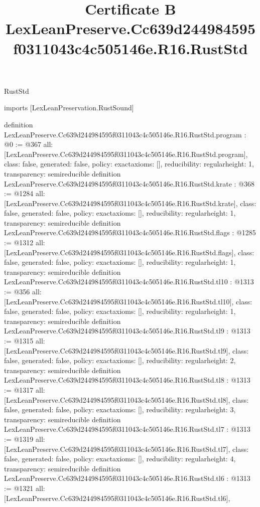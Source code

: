 \begin{lexlean}{RustStd}
\title{Certificate B LexLeanPreserve.Cc639d244984595f0311043c4c505146e.R16.RustStd}
\begin{coremodule}
imports [LexLeanPreservation.RustSound]

definition LexLeanPreserve.Cc639d244984595f0311043c4c505146e.R16.RustStd.program : @0 := @367 {
  all: [LexLeanPreserve.Cc639d244984595f0311043c4c505146e.R16.RustStd.program],
  class: false,
  generated: false,
  policy: exact{axioms: []},
  reducibility: regular{height: 1},
  transparency: semireducible
}
definition LexLeanPreserve.Cc639d244984595f0311043c4c505146e.R16.RustStd.krate : @368 := @1284 {
  all: [LexLeanPreserve.Cc639d244984595f0311043c4c505146e.R16.RustStd.krate],
  class: false,
  generated: false,
  policy: exact{axioms: []},
  reducibility: regular{height: 1},
  transparency: semireducible
}
definition LexLeanPreserve.Cc639d244984595f0311043c4c505146e.R16.RustStd.flags : @1285 := @1312 {
  all: [LexLeanPreserve.Cc639d244984595f0311043c4c505146e.R16.RustStd.flags],
  class: false,
  generated: false,
  policy: exact{axioms: []},
  reducibility: regular{height: 1},
  transparency: semireducible
}
definition LexLeanPreserve.Cc639d244984595f0311043c4c505146e.R16.RustStd.tl10 : @1313 := @356 {
  all: [LexLeanPreserve.Cc639d244984595f0311043c4c505146e.R16.RustStd.tl10],
  class: false,
  generated: false,
  policy: exact{axioms: []},
  reducibility: regular{height: 1},
  transparency: semireducible
}
definition LexLeanPreserve.Cc639d244984595f0311043c4c505146e.R16.RustStd.tl9 : @1313 := @1315 {
  all: [LexLeanPreserve.Cc639d244984595f0311043c4c505146e.R16.RustStd.tl9],
  class: false,
  generated: false,
  policy: exact{axioms: []},
  reducibility: regular{height: 2},
  transparency: semireducible
}
definition LexLeanPreserve.Cc639d244984595f0311043c4c505146e.R16.RustStd.tl8 : @1313 := @1317 {
  all: [LexLeanPreserve.Cc639d244984595f0311043c4c505146e.R16.RustStd.tl8],
  class: false,
  generated: false,
  policy: exact{axioms: []},
  reducibility: regular{height: 3},
  transparency: semireducible
}
definition LexLeanPreserve.Cc639d244984595f0311043c4c505146e.R16.RustStd.tl7 : @1313 := @1319 {
  all: [LexLeanPreserve.Cc639d244984595f0311043c4c505146e.R16.RustStd.tl7],
  class: false,
  generated: false,
  policy: exact{axioms: []},
  reducibility: regular{height: 4},
  transparency: semireducible
}
definition LexLeanPreserve.Cc639d244984595f0311043c4c505146e.R16.RustStd.tl6 : @1313 := @1321 {
  all: [LexLeanPreserve.Cc639d244984595f0311043c4c505146e.R16.RustStd.tl6],
}
\end{coremodule}
\end{lexlean}
